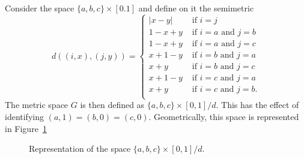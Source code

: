 \documentclass{article}
\theoremstyle{plain}\newtheorem{theorem}{Theorem}[section]
\theoremstyle{plain}\newtheorem{definition}[theorem]{Definition}
\theoremstyle{plain}\newtheorem{lemma}[theorem]{Lemma}
\theoremstyle{definition}\newtheorem{remark}[theorem]{Remark}
\theoremstyle{definition}\newtheorem{example}[theorem]{Example}
\theoremstyle{plain}\newtheorem{proposition}[theorem]{Proposition}
\theoremstyle{plain}\newtheorem{inference}[theorem]{Inference}
\theoremstyle{plain}\newtheorem{corollary}[theorem]{Corollary}
\theoremstyle{plain}\newtheorem{assumption}[theorem]{Assumption}
\begin{document}
Consider the space $\{a, b, c\} \times [0. 1]$ and define on it the semimetric
\begin{equation}\label{eq:definition-metric-mercedes}
  d((i, x), (j, y)) =
  \left\{\begin{array}{ll}
    |x - y|   & \text{ if } i = j                     \\
    1 - x + y & \text{ if } i = a \text{ and } j = b  \\
    1 - x + y & \text{ if } i = a \text{ and } j = c  \\
    x + 1 - y & \text{ if } i = b \text{ and } j = a  \\
    x + y     & \text{ if } i = b \text{ and } j = c  \\
    x + 1 - y & \text{ if } i = c \text{ and } j = a  \\
    x + y     & \text{ if } i = c \text{ and } j = b. \\
  \end{array}\right.
\end{equation}
The metric space $G$ is then defined as $\{a, b, c\} \times [0, 1] / d$. This has the
effect of identifying $(a, 1) = (b, 0) = (c, 0)$. Geometrically, this space is
represented in Figure~\ref{fig:mercedes}

\begin{figure}
    \centering
  \caption{Representation of the space $\{a, b, c\} \times [0, 1] / d$.}\label{fig:mercedes}
\end{figure}
\end{document}
